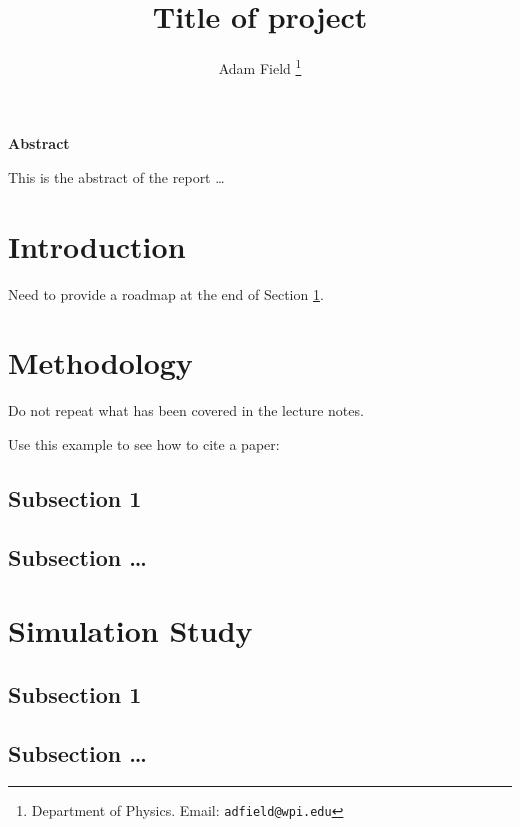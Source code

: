 \documentclass[12pt]{article}
\begin{document}
\title{Title of project}  

\author{
Adam Field   \thanks{Department of Physics.  Email: {\tt adfield@wpi.edu}}  
}

\maketitle

\begin{center}
\textbf{Abstract}
\end{center}

This is the abstract of the report \dots

\thispagestyle{empty}

\newpage


\section{Introduction}\label{intro}

Need to provide a roadmap at the end of Section \ref{intro}. 
 
\section{Methodology}

Do not repeat what has been covered in the lecture notes. 

Use this example to see how to cite a paper: \cite{rizzo2007statistical}

\subsection{Subsection 1}

\subsection{Subsection \dots}

\section{Simulation Study}	

\subsection{Subsection 1}

\subsection{Subsection \dots}
\end{document}
